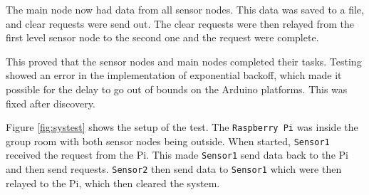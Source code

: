 The main node now had data from all sensor nodes. This data was saved to a file, and clear requests were send out. The clear requests were then relayed from the first level sensor node to the second one and the request were complete.

This proved that the sensor nodes and main nodes completed their tasks. Testing showed an error in the implementation of exponential backoff, which made it possible for the delay to go out of bounds on the Arduino platforms. This was fixed after discovery.

Figure \ref{fig:systest} shows the setup of the test. The \texttt{Raspberry Pi} was inside the group room with both sensor nodes being outside. When started, \texttt{Sensor1} received the request from the Pi. This made  \texttt{Sensor1} send data back to the Pi and then send requests. \texttt{Sensor2} then send data to \texttt{Sensor1} which were then relayed to the Pi, which then cleared the system.
